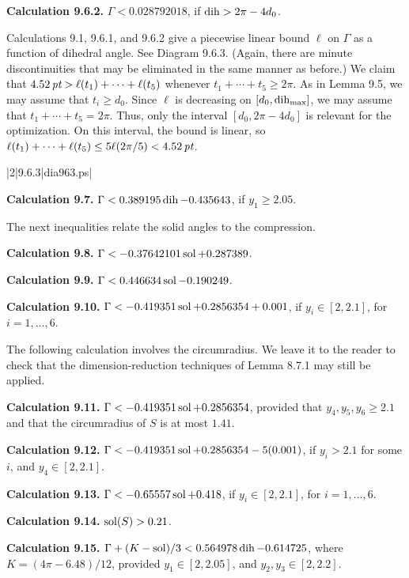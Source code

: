 \smallskip
{\bf Calculation 9.6.2.}  $\Gamma < 0.028792018$, if $\operatorname{dih}> 2\pi-4d_0$.


\smallskip
Calculations 9.1, 9.6.1, and 9.6.2 give a piecewise linear bound $\ell$
on $\Gamma$ as a function of dihedral angle.  See Diagram 9.6.3.
(Again, there are minute discontinuities that may be eliminated in the
same manner as before.)
  We claim that $4.52\,\hbox{\it pt} >
\ell(t_1)+\cdots+\ell(t_5)$ whenever $t_1+\cdots+t_5\ge 2\pi$.  As in
Lemma 9.5, we may assume that $t_i\ge d_0$.  Since $\ell$ 
is decreasing on $[d_0,\operatorname{dih}_{\max}]$, we may assume that $t_1+\cdots+t_5=2\pi$.
Thus, only the interval $[d_0,2\pi-4d_0]$ is relevant for
the optimization.  On this interval, the bound is linear, so
$\ell(t_1)+\cdots+\ell(t_5) \le 5 \ell(2\pi/5)   < 4.52\,\hbox{\it pt}$.

\gram|2|9.6.3|dia963.ps|  

\bigskip
{\bf Calculation 9.7.}  $\Gamma < 0.389195\operatorname{dih} -0.435643$,
        if $y_1\ge 2.05$.


\bigskip
The next inequalities relate the solid angles to the
compression. 

\smallskip
{\bf Calculation 9.8.} $\Gamma< -0.37642101\operatorname{sol} + 0.287389$.


\smallskip
{\bf Calculation 9.9.} $\Gamma< 0.446634 \operatorname{sol} -0.190249$.

\smallskip
{\bf Calculation 9.10.}  $\Gamma < -0.419351\operatorname{sol} + 0.2856354 + 0.001$,
if $y_i\in [2,2.1]$, for $i=1,\ldots,6$.

\smallskip
The following calculation involves the circumradius.  We leave
it to the reader to check that the dimension-reduction techniques
of Lemma 8.7.1 may still be applied.

\smallskip
{\bf Calculation 9.11.}  $\Gamma < -0.419351\operatorname{sol} + 0.2856354$,
provided that $y_4, y_5, y_6 \ge 2.1$ and that the circumradius of $S$
is at most $1.41$.

\smallskip
{\bf Calculation 9.12.}  $\Gamma < -0.419351\operatorname{sol} + 0.2856354 - 5(0.001)$,
if $y_i> 2.1$ for some $i$, 
and $y_4\in [2,2.1]$.

\smallskip
{\bf Calculation 9.13.}  $\Gamma < -0.65557\operatorname{sol} + 0.418$,
	if $y_i\in [2,2.1]$, for $i=1,\ldots,6$.

\smallskip
{\bf Calculation 9.14.}  $\operatorname{sol}(S) > 0.21$.

\smallskip
{\bf Calculation 9.15.}  $\Gamma+(K-\operatorname{sol})/3 < 0.564978\operatorname{dih}  -0.614725$,
where $K = (4\pi-6.48)/12$,
        provided $y_1\in [2,2.05]$, and
        $y_2,y_3\in [2,2.2]$.


